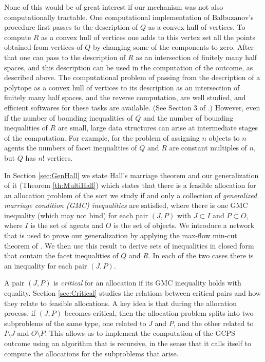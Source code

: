 \documentclass[12pt]{article}
\theoremstyle{definition}
\begin{document}
None of this would be of great interest if our mechanism was not also computationally tractable. One computational implementation of Balbuzanov's procedure first passes to the description of $Q$ as a convex hull of vertices.  To compute $R$ as a convex hull of vertices one adds to this vertex set all the points obtained from vertices of $Q$ by changing some of the components to zero.  After that one can pass to the description of $R$ as an intersection of finitely many half spaces, and this description can be used in the computation of the outcome, as described above.  The computational problem of passing from the description of a polytope as a convex hull of vertices to its description as an intersection of finitely many half spaces, and the reverse computation, are well studied, and efficient softwares for these tasks are available.  (See Section 3 of \cite{balbuzanov22jet}.)  However, even if the number of bounding inequalities of $Q$ and the number of bounding inequalities of $R$ are small, large data structures can arise at intermediate stages of the computation.  For example, for the problem of assigning $n$ objects to $n$ agents the numbers of facet inequalities of $Q$ and $R$ are constant multiples of $n$, but $Q$ has $n!$ vertices.

In Section \ref{sec:GenHall} we state Hall's marriage theorem and our generalization of it (Theorem \ref{th:MultiHall}) which states that there is a feasible allocation for an allocation problem of the sort we study if and only a collection of \emph{generalized marriage condition (GMC) inequalities} are satisfied, where there is one GMC inequality (which may not bind) for each pair $(J,P)$ with $J \subset I$ and $P \subset O$, where  $I$ is the set of agents and $O$ is the set of objects.
We introduce a network that is used to prove our generalization by applying the max-flow min-cut theorem of \cite{FoFu56}. We then use this result to derive sets of inequalities in closed form that contain the facet inequalities of $Q$ and $R$.  In each of the two cases there is an inequality for each pair $(J,P)$.

A pair $(J,P)$ is \emph{critical} for an allocation if its GMC inequality holds with equality.  Section \ref{sec:Critical} studies the relations between critical pairs and how they relate to feasible allocations.  A key idea is that during the allocation process, if $(J,P)$ becomes critical, then the allocation problem splits into two subproblems of the same type, one related to $J$ and $P$, and the other related to $I \setminus J$ and $O \setminus P$.  This allows us to implement the computation of the GCPS outcome using an algorithm that is recursive, in the sense that it calls itself to compute the allocations for the subproblems that arise.  
\end{document}
